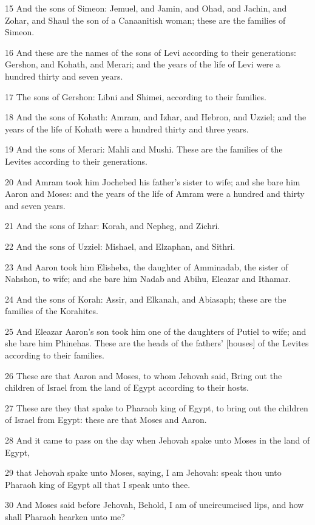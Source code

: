 \par 15 And the sons of Simeon: Jemuel, and Jamin, and Ohad, and Jachin, and Zohar, and Shaul the son of a Canaanitish woman; these are the families of Simeon.
\par 16 And these are the names of the sons of Levi according to their generations: Gershon, and Kohath, and Merari; and the years of the life of Levi were a hundred thirty and seven years.
\par 17 The sons of Gershon: Libni and Shimei, according to their families.
\par 18 And the sons of Kohath: Amram, and Izhar, and Hebron, and Uzziel; and the years of the life of Kohath were a hundred thirty and three years.
\par 19 And the sons of Merari: Mahli and Mushi. These are the families of the Levites according to their generations.
\par 20 And Amram took him Jochebed his father's sister to wife; and she bare him Aaron and Moses: and the years of the life of Amram were a hundred and thirty and seven years.
\par 21 And the sons of Izhar: Korah, and Nepheg, and Zichri.
\par 22 And the sons of Uzziel: Mishael, and Elzaphan, and Sithri.
\par 23 And Aaron took him Elisheba, the daughter of Amminadab, the sister of Nahshon, to wife; and she bare him Nadab and Abihu, Eleazar and Ithamar.
\par 24 And the sons of Korah: Assir, and Elkanah, and Abiasaph; these are the families of the Korahites.
\par 25 And Eleazar Aaron's son took him one of the daughters of Putiel to wife; and she bare him Phinehas. These are the heads of the fathers' [houses] of the Levites according to their families.
\par 26 These are that Aaron and Moses, to whom Jehovah said, Bring out the children of Israel from the land of Egypt according to their hosts.
\par 27 These are they that spake to Pharaoh king of Egypt, to bring out the children of Israel from Egypt: these are that Moses and Aaron.
\par 28 And it came to pass on the day when Jehovah spake unto Moses in the land of Egypt,
\par 29 that Jehovah spake unto Moses, saying, I am Jehovah: speak thou unto Pharaoh king of Egypt all that I speak unto thee.
\par 30 And Moses said before Jehovah, Behold, I am of uncircumcised lips, and how shall Pharaoh hearken unto me?

